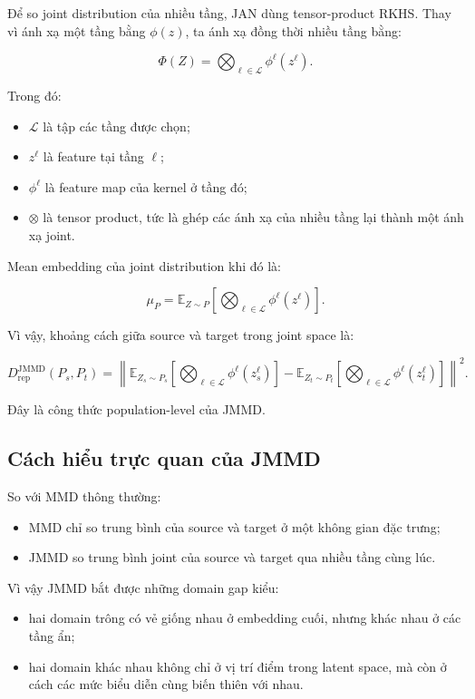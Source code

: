 \documentclass[a4paper]{article}
\begin{document}
Để so joint distribution của nhiều tầng, JAN dùng tensor-product RKHS. Thay vì ánh xạ một tầng bằng $\phi(z)$, ta ánh xạ đồng thời nhiều tầng bằng:

\[
\Phi(Z) = \bigotimes_{\ell \in \mathcal L} \phi^{\ell}(z^{\ell}).
\]

Trong đó:

\begin{itemize}
    \item $\mathcal{L}$ là tập các tầng được chọn;
    \item $z^{\ell}$ là feature tại tầng $\ell$;
    \item $\phi^{\ell}$ là feature map của kernel ở tầng đó;
    \item $\otimes$ là tensor product, tức là ghép các ánh xạ của nhiều tầng lại thành một ánh xạ joint.
\end{itemize}

Mean embedding của joint distribution khi đó là:

\[
\mu_P = \mathbb{E}_{Z \sim P}\left[\bigotimes_{\ell \in \mathcal L} \phi^{\ell}(z^{\ell})\right].
\]

Vì vậy, khoảng cách giữa source và target trong joint space là:

\[
D_{\mathrm{rep}}^{\mathrm{JMMD}}(P_s,P_t)
=
\left\|
\mathbb{E}_{Z_s \sim P_s}\left[\bigotimes_{\ell \in \mathcal L} \phi^{\ell}(z_s^{\ell})\right]
-
\mathbb{E}_{Z_t \sim P_t}\left[\bigotimes_{\ell \in \mathcal L} \phi^{\ell}(z_t^{\ell})\right]
\right\|^2.
\]

Đây là công thức population-level của JMMD.

\subsection{Cách hiểu trực quan của JMMD}

So với MMD thông thường:

\begin{itemize}
    \item MMD chỉ so trung bình của source và target ở một không gian đặc trưng;
    \item JMMD so trung bình joint của source và target qua nhiều tầng cùng lúc.
\end{itemize}

Vì vậy JMMD bắt được những domain gap kiểu:

\begin{itemize}
    \item hai domain trông có vẻ giống nhau ở embedding cuối, nhưng khác nhau ở các tầng ẩn;
    \item hai domain khác nhau không chỉ ở vị trí điểm trong latent space, mà còn ở cách các mức biểu diễn cùng biến thiên với nhau.
\end{itemize}
\end{document}
